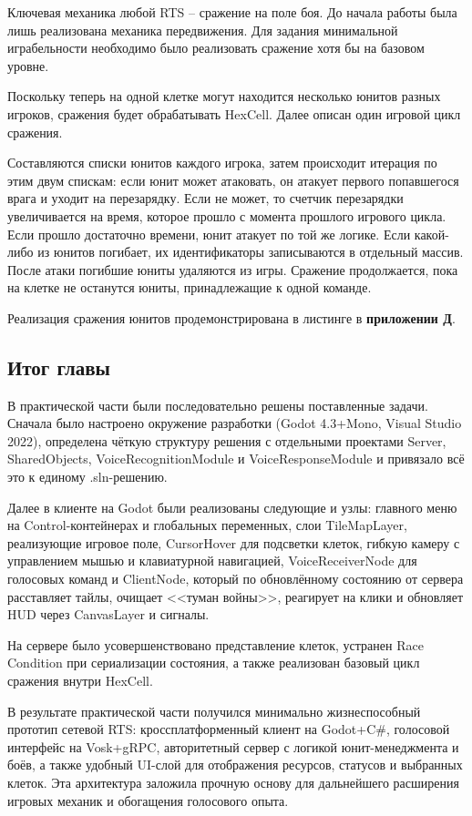        Ключевая механика любой RTS -- сражение на поле боя. До начала работы была лишь реализована механика передвижения. Для задания минимальной играбельности необходимо было реализовать сражение хотя бы на базовом уровне.

        Поскольку теперь на одной клетке могут находится несколько юнитов разных игроков, сражения будет обрабатывать HexCell. Далее описан один игровой цикл сражения. 
        
        Составляются списки юнитов каждого игрока, затем происходит итерация по этим двум спискам: если юнит может атаковать, он атакует первого попавшегося врага и уходит на перезарядку. Если не может, то счетчик перезарядки увеличивается на время, которое прошло с момента прошлого игрового цикла. Если прошло достаточно времени, юнит атакует по той же логике. Если какой-либо из юнитов погибает, их идентификаторы записываются в отдельный массив. После атаки погибшие юниты удаляются из игры. Сражение продолжается, пока на клетке не останутся юниты, принадлежащие к одной команде.

        Реализация сражения юнитов продемонстрирована в листинге в \textbf{приложении Д}.
    \subsection{Итог главы}

    В практической части были последовательно решены поставленные задачи. Сначала было настроено окружение разработки (Godot 4.3+Mono, Visual Studio 2022), определена чёткую структуру решения с отдельными проектами Server, SharedObjects, VoiceRecognitionModule и VoiceResponseModule и привязало всё это к единому .sln-решению.

    Далее в клиенте на Godot были реализованы следующие и узлы: главного меню на Control-контейнерах и глобальных переменных, слои TileMapLayer, реализующие игровое поле, CursorHover для подсветки клеток, гибкую камеру с управлением мышью и клавиатурной навигацией, VoiceReceiverNode для голосовых команд и ClientNode, который по обновлённому состоянию от сервера расставляет тайлы, очищает <<туман войны>>, реагирует на клики и обновляет HUD через CanvasLayer и сигналы.
    
    На сервере было усовершенствовано представление клеток, устранен Race Condition при сериализации состояния, а также реализован базовый цикл сражения внутри HexCell.
    
    В результате практической части получился минимально жизнеспособный прототип сетевой RTS: кроссплатформенный клиент на Godot+C\#, голосовой интерфейс на Vosk+gRPC, авторитетный сервер с логикой юнит-менеджмента и боёв, а также удобный UI-слой для отображения ресурсов, статусов и выбранных клеток. Эта архитектура заложила прочную основу для дальнейшего расширения игровых механик и обогащения голосового опыта.